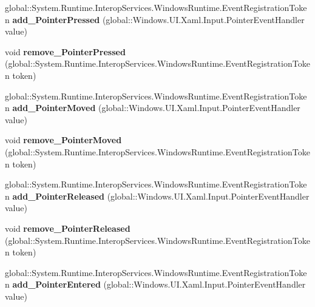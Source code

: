 \begin{DoxyCompactItemize}
global\+::\+System.\+Runtime.\+Interop\+Services.\+Windows\+Runtime.\+Event\+Registration\+Token {\bfseries add\+\_\+\+Pointer\+Pressed} (global\+::\+Windows.\+U\+I.\+Xaml.\+Input.\+Pointer\+Event\+Handler value)
\item 
\mbox{\label{interface_windows_1_1_u_i_1_1_xaml_1_1_i_u_i_element_a11ea5ff510170be96baba63e50ef0d68}} 
void {\bfseries remove\+\_\+\+Pointer\+Pressed} (global\+::\+System.\+Runtime.\+Interop\+Services.\+Windows\+Runtime.\+Event\+Registration\+Token token)
\item 
\mbox{\label{interface_windows_1_1_u_i_1_1_xaml_1_1_i_u_i_element_a186c081f1e37b9989fc4ddd5820d840c}} 
global\+::\+System.\+Runtime.\+Interop\+Services.\+Windows\+Runtime.\+Event\+Registration\+Token {\bfseries add\+\_\+\+Pointer\+Moved} (global\+::\+Windows.\+U\+I.\+Xaml.\+Input.\+Pointer\+Event\+Handler value)
\item 
\mbox{\label{interface_windows_1_1_u_i_1_1_xaml_1_1_i_u_i_element_ad8d5295f79014845522686f6bf012501}} 
void {\bfseries remove\+\_\+\+Pointer\+Moved} (global\+::\+System.\+Runtime.\+Interop\+Services.\+Windows\+Runtime.\+Event\+Registration\+Token token)
\item 
\mbox{\label{interface_windows_1_1_u_i_1_1_xaml_1_1_i_u_i_element_ab3b709a6be4af0f8547f52d2157bd763}} 
global\+::\+System.\+Runtime.\+Interop\+Services.\+Windows\+Runtime.\+Event\+Registration\+Token {\bfseries add\+\_\+\+Pointer\+Released} (global\+::\+Windows.\+U\+I.\+Xaml.\+Input.\+Pointer\+Event\+Handler value)
\item 
\mbox{\label{interface_windows_1_1_u_i_1_1_xaml_1_1_i_u_i_element_abd23ebff773fb5a9158d2ee59097988e}} 
void {\bfseries remove\+\_\+\+Pointer\+Released} (global\+::\+System.\+Runtime.\+Interop\+Services.\+Windows\+Runtime.\+Event\+Registration\+Token token)
\item 
\mbox{\label{interface_windows_1_1_u_i_1_1_xaml_1_1_i_u_i_element_a54194f94b331caa84198af8f0147c1f1}} 
global\+::\+System.\+Runtime.\+Interop\+Services.\+Windows\+Runtime.\+Event\+Registration\+Token {\bfseries add\+\_\+\+Pointer\+Entered} (global\+::\+Windows.\+U\+I.\+Xaml.\+Input.\+Pointer\+Event\+Handler value)

\end{DoxyCompactItemize}
